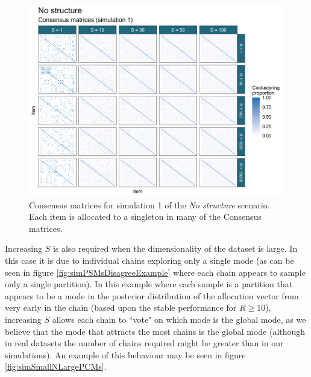 \documentclass[]{article}
\begin{document}
\begin{figure} %
	\centering
	\includegraphics[scale=0.65]{./Images/Simulations/CMs/no_structureSim1.png}
	\caption{Consensus matrices for simulation 1 of the \emph{No structure} scenario. Each item is allocated to a singleton in many of the Consensus matrices.}
	\label{fig:simNoStructCMs}
\end{figure}

Increasing $S$ is also required when the dimensionality of the dataset is large. In this case it is due to individual chains exploring only a single mode (as can be seen in figure \ref{fig:simPSMsDisagreeExample} where each chain appears to sample only a single partition). In this example where each sample is a partition that appears to be a mode in the posterior distribution of the allocation vector from very early in the chain (based upon the stable performance for $R \geq 10$), increasing $S$ allows each chain to ``vote" on which mode is the global mode, as we believe that the mode that attracts the most chains is the global mode (although in real datasets the number of chains required might be greater than in our simulations). An example of this behaviour may be seen in figure \ref{fig:simSmallNLargePCMs}.
\end{document}
